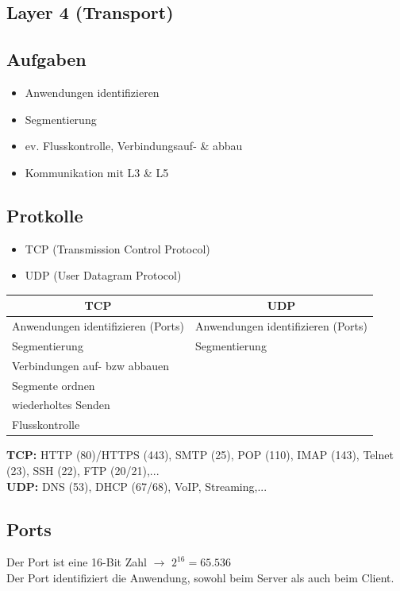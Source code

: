\subsection{Layer 4 (Transport)}
\subsection*{Aufgaben}
\begin{itemize}
	\item Anwendungen identifizieren
	\item Segmentierung
	\item ev. Flusskontrolle, Verbindungsauf- \& abbau
	\item Kommunikation mit L3 \& L5
\end{itemize}

\subsection*{Protkolle} 
\begin{itemize}
	\item TCP (Transmission Control Protocol)
	\item UDP (User Datagram Protocol)
\end{itemize}

\begin{table}[H]
	\begin{tabular}{l|l}
		\multicolumn{1}{c|}{TCP} & \multicolumn{1}{c}{UDP} \\
		\hline
		Anwendungen identifizieren (Ports) & Anwendungen identifizieren (Ports) \\
		Segmentierung & Segmentierung \\
		Verbindungen auf- bzw abbauen &  \\
		Segmente ordnen &  \\
		wiederholtes Senden &  \\
		Flusskontrolle & 
	\end{tabular}
\end{table}
\textbf{TCP:} HTTP (80)/HTTPS (443), SMTP (25), POP (110), IMAP (143), Telnet (23), SSH (22), FTP (20/21),... \\
\textbf{UDP:} DNS (53), DHCP (67/68), VoIP, Streaming,...

\subsection*{Ports}
Der Port ist eine 16-Bit Zahl $\rightarrow$ $2^{16} = 65.536$ \\
Der Port identifiziert die Anwendung, sowohl beim Server als auch beim Client.

